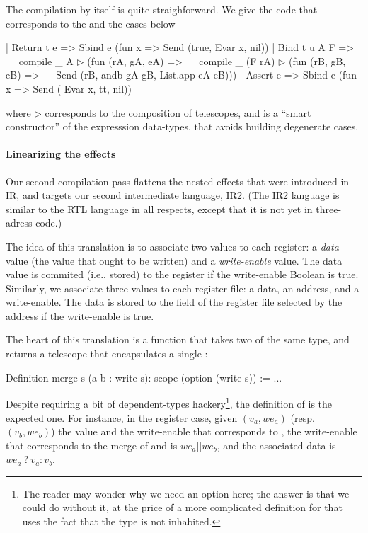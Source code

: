 \documentclass[preprint]{sigplanconf}
\begin{document}
The compilation by itself is quite straighforward. We give the code
that corresponds to the  and the  cases below
\begin{coq}
| Return t e => Sbind e (fun x => Send (true, Evar x, nil))
| Bind t u A F =>
$\quad$ compile _ A $\rhd$ (fun (rA, gA, eA) =>
$\quad$ compile _ (F rA) $\rhd$ (fun (rB, gB, eB) =>
$\quad$ Send (rB, andb gA gB, List.app eA eB))) 
| Assert e => Sbind e (fun x => Send ( Evar x, tt, nil))
\end{coq}
where $\rhd$ corresponds to the composition of telescopes, and
 is a ``smart constructor'' of the expresssion data-types,
that avoids building degenerate cases.

\paragraph{Linearizing the effects} Our second compilation pass
flattens the nested effects that were introduced in IR, and targets
our second intermediate language, IR2. (The IR2 language is similar to
the RTL language in all respects, except that it is not yet in
three-adress code.)

The idea of this translation is to associate two values to each
register: a \emph{data} value (the value that ought to be written) and
a \emph{write-enable} value. The data value is commited (i.e., stored)
to the register if the write-enable Boolean is true.
%
Similarly, we associate three values to each register-file: a data, an
address, and a write-enable. The data is stored to the field of the
register file selected by the address if the write-enable is true.  

The heart of this translation is a  function that takes
two  of the same type, and returns a telescope that
encapsulates a single : 
\begin{coq}
Definition merge s (a b : write s): scope (option (write s)) := ...   
\end{coq}
Despite requiring a bit of dependent-types hackery\footnote{The
  reader may wonder why we need an option here; the answer is that we
  could do without it, at the price of a more complicated definition
  for  that uses the fact that the type
%
  \mbox{} is not inhabited.}, the definition of
 is the expected one.
%
For instance, in the register case, given $(v_a,we_a)$ (resp. $(v_b,
we_b)$) the value and the write-enable that corresponds to ,
the write-enable that corresponds to the merge of  and
 is $we_a || we_b$, and the associated data is \mbox{$we_a~?~v_a :
v_b$}.
\end{document}
